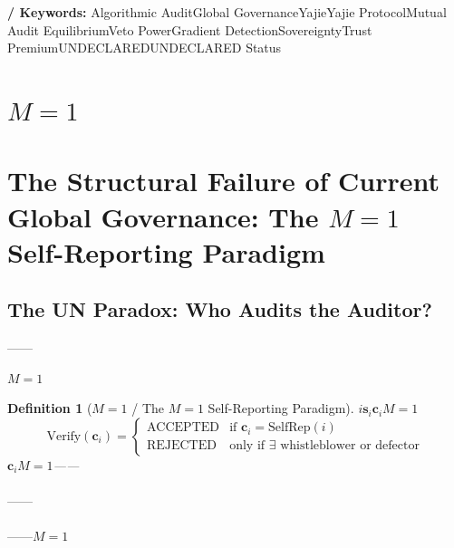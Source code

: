 \documentclass[12pt,a4paper]{article}
\newtheorem{definition}[theorem]{Definition}
\theoremstyle{remark}
\begin{document}
\bigskip

\noindent\textbf{ / Keywords:} Algorithmic AuditGlobal GovernanceYajieYajie ProtocolMutual Audit EquilibriumVeto PowerGradient DetectionSovereigntyTrust PremiumUNDECLAREDUNDECLARED Status


\section{$M=1$}
\section{The Structural Failure of Current Global Governance: The $M=1$ Self-Reporting Paradigm}

\subsection{}
\subsection{The UN Paradox: Who Audits the Auditor?}

——

$M=1$

\begin{definition}[$M=1$  / The $M=1$ Self-Reporting Paradigm]
    $i$$\mathbf{s}_i$$\mathbf{c}_i$$M=1$
    \begin{equation}
        \text{Verify}(\mathbf{c}_i) = \begin{cases}
            \text{ACCEPTED} & \text{if } \mathbf{c}_i = \text{SelfRep}(i) \\
            \text{REJECTED}  & \text{only if } \exists \text{ whistleblower or defector}
        \end{cases}
    \end{equation}
    $\mathbf{c}_i$$M=1$——
\end{definition}

\textbf{}



\paragraph{}\textbf{}——

\paragraph{}——$M=1$\textbf{}
\end{document}
